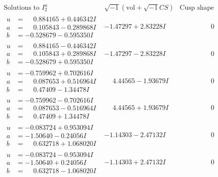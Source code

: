 \documentclass[1p]{elsarticle_modified}
\theoremstyle{definition}
\newcommand{\I}{\sqrt{-1}}
\begin{document}
$$\begin{array}{c|c|c}  
\text{Solutions to }I^u_{2}& \I (\text{vol} + \sqrt{-1}CS) & \text{Cusp shape}\\
 \hline 
\begin{aligned}
u &= \phantom{-}0.884165 + 0.446342 I \\
a &= \phantom{-}0.105843 - 0.289868 I \\
b &= -0.528679 - 0.595350 I\end{aligned}
 & -1.47297 + 2.83228 I & \phantom{-0.000000 } 0 \\ \hline\begin{aligned}
u &= \phantom{-}0.884165 - 0.446342 I \\
a &= \phantom{-}0.105843 + 0.289868 I \\
b &= -0.528679 + 0.595350 I\end{aligned}
 & -1.47297 - 2.83228 I & \phantom{-0.000000 } 0 \\ \hline\begin{aligned}
u &= -0.759962 + 0.702616 I \\
a &= \phantom{-}0.087653 + 0.516964 I \\
b &= \phantom{-}0.47409 - 1.34478 I\end{aligned}
 & \phantom{-}4.44565 - 1.93679 I & \phantom{-0.000000 } 0 \\ \hline\begin{aligned}
u &= -0.759962 - 0.702616 I \\
a &= \phantom{-}0.087653 - 0.516964 I \\
b &= \phantom{-}0.47409 + 1.34478 I\end{aligned}
 & \phantom{-}4.44565 + 1.93679 I & \phantom{-0.000000 } 0 \\ \hline\begin{aligned}
u &= -0.083724 + 0.953094 I \\
a &= -1.50640 - 0.24056 I \\
b &= \phantom{-}0.632718 + 1.068020 I\end{aligned}
 & -1.14303 - 2.47132 I & \phantom{-0.000000 } 0 \\ \hline\begin{aligned}
u &= -0.083724 - 0.953094 I \\
a &= -1.50640 + 0.24056 I \\
b &= \phantom{-}0.632718 - 1.068020 I\end{aligned}
 & -1.14303 + 2.47132 I & \phantom{-0.000000 } 0 \\ \hline\begin{aligned}

\end{aligned}
\end{array}$$
\end{document}
